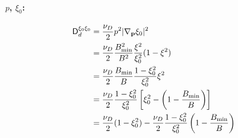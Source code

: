 \documentclass[11pt,a4paper]{article}
\newcommand{\sub}[1]{\ensuremath{_{\text{#1}}}}
\renewcommand{\b}[1]{\ensuremath{ {\bf #1 } }}
\begin{document}
\paragraph{$p$, $\xi_0$:}
\begin{align}
\mathsf{D}_d^{\xi_0 \xi_0} &=  \frac{\nu_D}{2}p^2 |\nabla_\b{p}\xi_0|^2  \nonumber \\
&= \frac{\nu_D}{2} \frac{B\sub{min}^2}{B^2}\frac{\xi^2}{\xi_0^2}(1-\xi^2) \nonumber \\
&= \frac{\nu_D}{2} \frac{B\sub{min}}{B}\frac{1-\xi_0^2}{\xi_0^2}\xi^2 \nonumber \\
&= \frac{\nu_D}{2}\frac{1-\xi_0^2}{\xi_0^2} \left[\xi_0^2 - \left(1-\frac{B\sub{min}}{B}\right)\right] \nonumber \\
&= \frac{\nu_D}{2}(1-\xi_0^2) - \frac{\nu_D}{2}\frac{1-\xi_0^2}{\xi_0^2}\left(1-\frac{B\sub{min}}{B}\right)
\end{align}
\end{document}
